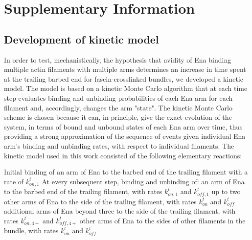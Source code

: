 \section{Supplementary Information}\label{ch02-si}

\subsection{Development of kinetic model}\label{ena-si-develop-model}
In order to test, mechanistically, the hypothesis that avidity of Ena binding multiple actin filaments with multiple arms determines an increase in time spent at the trailing barbed end for fascin-crosslinked bundles, we developed a kinetic model. The model is based on a kinetic Monte Carlo algorithm that at each time step evaluates binding and unbinding probabilities of each Ena arm for each filament and, accordingly, changes the arm "state". The kinetic Monte Carlo scheme is chosen because it can, in principle, give the exact evolution of the system, in terms of bound and unbound states of each Ena arm over time, thus providing a strong approximation of the sequence of events given individual Ena arm's binding and unbinding rates, with respect to individual filaments. The kinetic model used in this work consisted of the following elementary reactions:
\begin{outline}[enumerate]
   \1 Initial binding of an arm of Ena to the barbed end of the trailing filament with a rate of $k_{on,1}^{t}$
   \1 At every subsequent step, binding and unbinding of:
      \2 an arm of Ena to the barbed end of the trailing filament, with rates $k_{on,1}^{t}$ and $k_{off,1}^{t}$
      \2 up to two other arms of Ena to the side of the trailing filament, with rates $k_{on}^{t}$ and $k_{off}^{t}$
      \2 additional arms of Ena beyond three to the side of the trailing filament, with rates $k_{on,4+}^{t}$ and $k_{off,4+}^{t}$
      \2 other arms of Ena to the sides of other filaments in the bundle, with rates $k_{on}^{l}$ and $k_{off}^{l}$
\end{outline}

